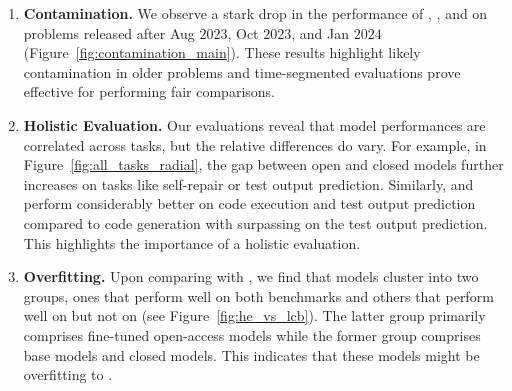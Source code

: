 \begin{enumerate}
\itemsep-0.1em 
    \item \textbf{Contamination.} 
    We observe a stark drop in the performance of \deepseek{}, \gptfouro{}, and \codestral{} on \leetcode{} problems released after Aug $2023$, Oct $2023$, and Jan $2024$ (Figure~\ref{fig:contamination_main}). These results highlight likely contamination in older problems and time-segmented evaluations 
    prove effective for performing fair comparisons.
    
    \item \textbf{Holistic Evaluation.} 
    Our evaluations reveal that model performances are correlated across tasks, but the relative differences do vary. 
    For example, in Figure~\ref{fig:all_tasks_radial}, the gap between open and closed models further increases on tasks like self-repair or test output prediction. 
    Similarly,  \claudeopus{} and \mistrallarge{} perform considerably better on code execution and test output prediction compared to code generation with \claudeopus{} surpassing \gptfour{} on the test output prediction. This highlights the importance of a holistic evaluation.
    
    \item \textbf{\humaneval{} Overfitting.} 
    Upon comparing \livecodebench{} with \humaneval{}, we find that models cluster into two groups, ones that perform well on both benchmarks and others that perform well on \humaneval{} but not on \livecodebench{} (see Figure~\ref{fig:he_vs_lcb}).
    The latter group primarily comprises fine-tuned open-access models while the former group comprises base models and closed models.
    This indicates that these models might be overfitting to \humaneval{}. %


\end{enumerate}
